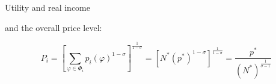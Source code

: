 \documentclass[notes,11pt, aspectratio=169, xcolor=table]{beamer}
\newenvironment{wideitemize}{\itemize\addtolength{\itemsep}{10pt}}{\enditemize}
\begin{document}
\begin{frame}{Utility and real income}

\begin{wideitemize}
    \item and the overall price level:

\begin{equation*}
    P_i = \left[ \sum_{\varphi \in \Phi_i } p_i(
\varphi)^{1-\sigma} \right]^{\tfrac{1}{1-\sigma} }  = \left[ N^* (p^*)^{1-\sigma} \right]^{\tfrac{1}{1-\sigma} }  = \frac{p^*}{(N^*)^{\tfrac{1}{\sigma-1} } } 
\end{equation*}

\end{wideitemize}
    
\end{frame}

\newpage






\end{document}
